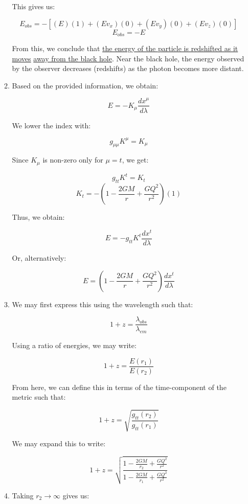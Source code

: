 \begin{enumerate}
\begin{enumerate}
        This gives us:

        $$E_{obs}=-[(E)(1)+(Ev_x)(0)+(Ev_y)(0)+(Ev_z)(0)]$$
        $$\boxed{E_{obs}=-E}$$

        From this, we conclude that \underline{the energy of the particle is redshifted as it moves} \underline{away from the black hole}. Near the black hole, the energy observed by the observer decreases (redshifts) as the photon becomes more distant.

      \item 

        Based on the provided information, we obtain:

        $$E=-K_\mu\frac{dx^{\mu}}{d\lambda}$$

        We lower the index with:

        $$g_{\mu\mu}K^{\mu}=K_{\mu}$$

        Since $K_{\mu}$ is non-zero only for $\mu=t$, we get:

        $$g_{tt}K^{t}=K_{t}$$
        $$K_{t}=-\left( 1-\frac{2GM}{r}+\frac{GQ^2}{r^2} \right)(1)$$

        Thus, we obtain:

        $$\boxed{E=-g_{tt}K^t\frac{dx^{t}}{d\lambda}}$$

        Or, alternatively:

        $$\boxed{E=\left( 1-\frac{2GM}{r} +\frac{GQ^2}{r^2}\right)\frac{dx^{t}}{d\lambda}}$$

      \item 

        We may first express this using the wavelength such that:

        $$1+z=\frac{\lambda_{obs}}{\lambda_{em}}$$

        Using a ratio of energies, we may write:

        $$1+z=\frac{E(r_1)}{E(r_2)}$$

        From here, we can define this in terms of the time-component of the metric such that:

        $$1+z=\sqrt{\frac{g_{tt}(r_2)}{g_{tt}(r_1)}}$$

        We may expand this to write:

        $$\boxed{1+z=\sqrt{\frac{1-\frac{2GM}{r_2}+\frac{GQ^2}{r^2}}{1-\frac{2GM}{r_1}+\frac{GQ^2}{r^2}}}}$$

      \item 

        Taking $r_2\to\infty$ gives us:


\end{enumerate}
\end{enumerate}
